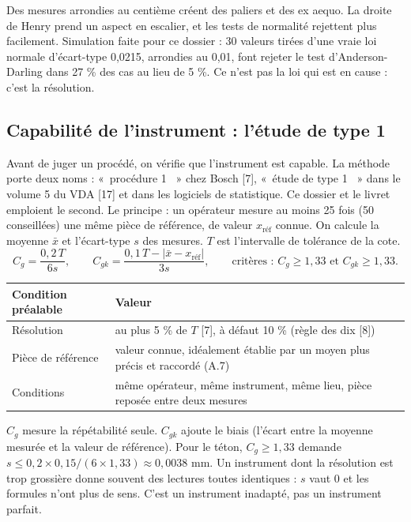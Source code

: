 \documentclass[11pt,a4paper]{article}
\providecommand{\og}{«~}\providecommand{\fg}{~»}
\begin{document}
\begin{attention}
Des mesures arrondies au centième créent des paliers et des ex aequo. La droite de Henry prend un aspect en escalier, et les tests de normalité rejettent plus facilement. Simulation faite pour ce dossier : 30 valeurs tirées d'une vraie loi normale d'écart-type 0,0215, arrondies au 0,01, font rejeter le test d'Anderson-Darling dans 27 \% des cas au lieu de 5 \%. Ce n'est pas la loi qui est en cause : c'est la résolution.
\end{attention}

\subsection{Capabilité de l'instrument : l'étude de type 1}\label{sec:cg}
Avant de juger un procédé, on vérifie que l'instrument est capable. La méthode porte deux noms : \og procédure 1 \fg{} chez Bosch [7], \og étude de type 1 \fg{} dans le volume 5 du VDA [17] et dans les logiciels de statistique. Ce dossier et le livret emploient le second. Le principe : un opérateur mesure au moins 25 fois (50 conseillées) une même pièce de référence, de valeur $x_{\text{réf}}$ connue. On calcule la moyenne $\bar x$ et l'écart-type $s$ des mesures. $T$ est l'intervalle de tolérance de la cote.
\[
C_g=\frac{0{,}2\,T}{6s},\qquad C_{gk}=\frac{0{,}1\,T-|\bar x-x_{\text{réf}}|}{3s},\qquad\text{critères : } C_g\ge1{,}33\text{ et }C_{gk}\ge1{,}33.
\]
\begin{center}\small
\begin{tabularx}{\textwidth}{@{}lX@{}}\toprule
\textbf{Condition préalable} & \textbf{Valeur}\\\midrule
Résolution & au plus 5 \% de $T$ [7], à défaut 10 \% (règle des dix [8])\\
Pièce de référence & valeur connue, idéalement établie par un moyen plus précis et raccordé (A.7)\\
Conditions & même opérateur, même instrument, même lieu, pièce reposée entre deux mesures\\\bottomrule
\end{tabularx}
\end{center}
$C_g$ mesure la répétabilité seule. $C_{gk}$ ajoute le biais (l'écart entre la moyenne mesurée et la valeur de référence). Pour le téton, $C_g\ge1{,}33$ demande $s\le0{,}2\times0{,}15/(6\times1{,}33)\approx0{,}0038$ mm. Un instrument dont la résolution est trop grossière donne souvent des lectures toutes identiques : $s$ vaut 0 et les formules n'ont plus de sens. C'est un instrument inadapté, pas un instrument parfait.
\end{document}
